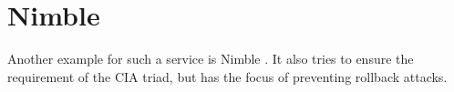 \section{Nimble}
Another example for such a service is Nimble \cite{Nimble}. It also tries to ensure the requirement of the CIA triad, but has the focus of preventing rollback attacks. 